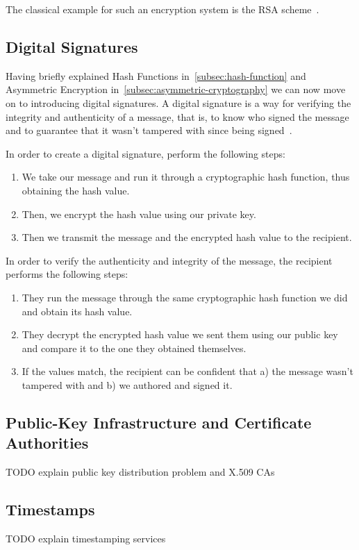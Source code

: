 The classical example for such an encryption system is the \gls{RSA} scheme~\cite{rsa}.

\subsection{Digital Signatures}\label{subsec:digital-signatures}
Having briefly explained Hash Functions in~\ref{subsec:hash-function} and Asymmetric Encryption in~\ref{subsec:asymmetric-cryptography} we can now move on to introducing digital signatures.
A digital signature is a way for verifying the integrity and authenticity of a message, that is,
to know who signed the message and to guarantee that it wasn't tampered with since being signed~\cite{digitalsignature}.

In order to create a digital signature, perform the following steps:
\begin{enumerate}
    \item We take our message and run it through a cryptographic hash function, thus obtaining the hash value.
    \item Then, we encrypt the hash value using our private key.
    \item Then we transmit the message and the encrypted hash value to the recipient.
\end{enumerate}

In order to verify the authenticity and integrity of the message, the recipient performs the following steps:
\begin{enumerate}
    \item They run the message through the same cryptographic hash function we did and obtain its hash value.
    \item They decrypt the encrypted hash value we sent them using our public key and compare it to the one they obtained themselves.
    \item If the values match, the recipient can be confident that a) the message wasn't tampered with and b) we authored and signed it.
\end{enumerate}

\subsection{Public-Key Infrastructure and Certificate Authorities}\label{subsec:public-key-infrastructure-and-certificate-authorities}
TODO explain public key distribution problem and X.509 CAs

\subsection{Timestamps}\label{subsec:timestamps}
TODO explain timestamping services

